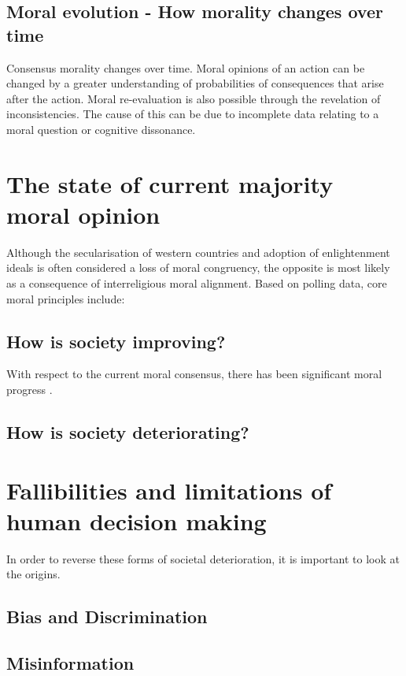 \subsection{Moral evolution - How morality changes over time}
Consensus morality changes over time.
Moral opinions of an action can be changed by a greater understanding of probabilities of consequences that arise after the action.
Moral re-evaluation is also possible through the revelation of inconsistencies.
The cause of this can be due to incomplete data relating to a moral question or cognitive dissonance.

\section{The state of current majority moral opinion}
Although the secularisation of western countries and adoption of enlightenment ideals is often considered a loss of moral congruency, the opposite is most likely as a consequence of interreligious moral alignment.
Based on polling data, core moral principles include:

\subsection{How is society improving?}
With respect to the current moral consensus, there has been significant moral progress \cite{pinker2011better}.

\subsection{How is society deteriorating?}

\section{Fallibilities and limitations of human decision making}
In order to reverse these forms of societal deterioration, it is important to look at the origins.
\subsection{Bias and Discrimination}
\subsection{Misinformation}
